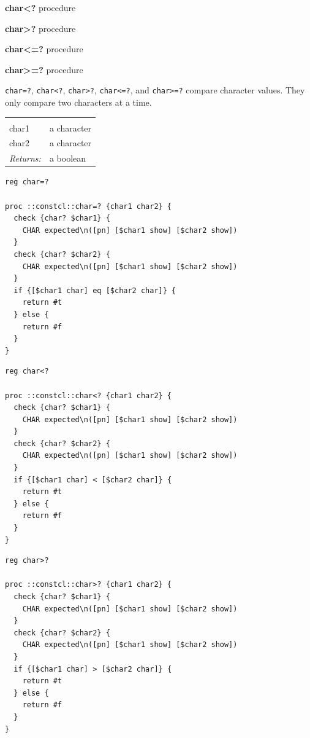 \documentclass[twoside]{report}
\begin{document}
\noindent \textbf{char<?} procedure

\noindent \textbf{char>?} procedure

\noindent \textbf{char<=?} procedure

\noindent \textbf{char>=?} procedure

\texttt{char=?}, \texttt{char<?}, \texttt{char>?}, \texttt{char<=?}, and \texttt{char>=?} compare character values. They only compare two characters at a time.

\noindent\begin{tabular}{ |p{1.9cm} p{8cm}| }
\hline
\rowcolor[HTML]{CCCCCC} \multicolumn{2}{|l|}{\bf char=?, char<?, char>?, char<=?, char>=? (public)} \\
char1 & a character \\
char2 & a character \\
\textit{Returns:} & a boolean \\
\hline
\end{tabular}

\begin{lstlisting}
reg char=?

proc ::constcl::char=? {char1 char2} {
  check {char? $char1} {
    CHAR expected\n([pn] [$char1 show] [$char2 show])
  }
  check {char? $char2} {
    CHAR expected\n([pn] [$char1 show] [$char2 show])
  }
  if {[$char1 char] eq [$char2 char]} {
    return #t
  } else {
    return #f
  }
}
\end{lstlisting}

\begin{lstlisting}
reg char<?

proc ::constcl::char<? {char1 char2} {
  check {char? $char1} {
    CHAR expected\n([pn] [$char1 show] [$char2 show])
  }
  check {char? $char2} {
    CHAR expected\n([pn] [$char1 show] [$char2 show])
  }
  if {[$char1 char] < [$char2 char]} {
    return #t
  } else {
    return #f
  }
}
\end{lstlisting}

\begin{lstlisting}
reg char>?

proc ::constcl::char>? {char1 char2} {
  check {char? $char1} {
    CHAR expected\n([pn] [$char1 show] [$char2 show])
  }
  check {char? $char2} {
    CHAR expected\n([pn] [$char1 show] [$char2 show])
  }
  if {[$char1 char] > [$char2 char]} {
    return #t
  } else {
    return #f
  }
}
\end{lstlisting}
\end{document}

